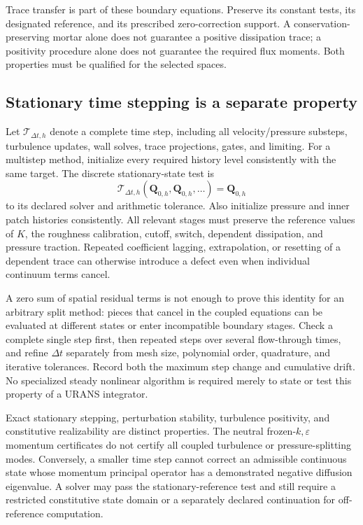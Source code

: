 \documentclass[11pt,a4paper]{article}
\numberwithin{equation}{section}
\newcommand{\eps}{\varepsilon}
\begin{document}
Trace transfer is part of these boundary equations.  Preserve its
constant tests, its designated reference, and its prescribed
zero-correction support.  A conservation-preserving mortar alone
does not guarantee a positive dissipation trace; a positivity
procedure alone does not guarantee the required flux moments.
Both properties must be qualified for the selected spaces.

\subsection{Stationary time stepping is a separate property}
\label{num:stationary-map}

Let $\mathcal T_{\Delta t,h}$ denote a complete time step, including
all velocity/pressure substeps, turbulence updates, wall solves,
trace projections, gates, and limiting.  For a multistep method,
initialize every required history level consistently with the
same target.  The discrete stationary-state test is
\begin{equation}
 \boxed{\mathcal T_{\Delta t,h}
 (\boldsymbol Q_{0,h},\boldsymbol Q_{0,h},\ldots)
 =\boldsymbol Q_{0,h}}
 \label{num:temporal-stationarity}
\end{equation}
to its declared solver and arithmetic tolerance.  Also initialize
pressure and inner patch histories consistently.  All relevant
stages must preserve the reference values of $K$, the roughness
calibration, cutoff, switch, dependent dissipation, and pressure
traction.  Repeated coefficient lagging, extrapolation, or resetting
of a dependent trace can otherwise introduce a defect even when
individual continuum terms cancel.

A zero sum of spatial residual terms is not enough to prove this
identity for an arbitrary split method: pieces that cancel in the
coupled equations can be evaluated at different states or enter
incompatible boundary stages.  Check a complete single step first,
then repeated steps over several flow-through times, and refine
$\Delta t$ separately from mesh size, polynomial order, quadrature,
and iterative tolerances.  Record both the maximum step change and
cumulative drift.  No specialized steady nonlinear algorithm is
required merely to state or test this property of a URANS
integrator.

Exact stationary stepping, perturbation stability, turbulence
positivity, and constitutive realizability are distinct properties.
The neutral frozen-$k,\eps$ momentum certificates do not certify
all coupled turbulence or pressure-splitting modes.  Conversely,
a smaller time step cannot correct an admissible continuous state
whose momentum principal operator has a demonstrated negative
diffusion eigenvalue.  A solver may pass the stationary-reference
test and still require a restricted constitutive state domain or
a separately declared continuation for off-reference computation.
\end{document}
